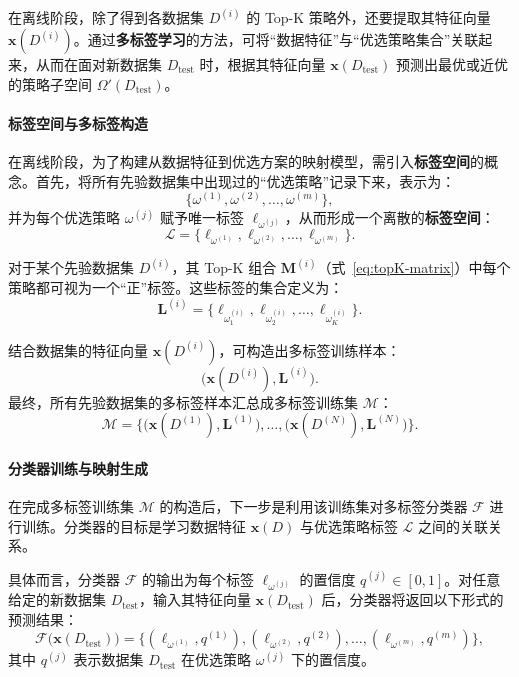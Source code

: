 \documentclass[10pt]{article} %
\numberwithin{equation}{section}
\begin{document}
在离线阶段，除了得到各数据集 $D^{(i)}$ 的 Top-K 策略外，还要提取其特征向量 $\mathbf{x}(D^{(i)})$。通过\textbf{多标签学习}的方法，可将“数据特征”与“优选策略集合”关联起来，从而在面对新数据集 $D_{\text{test}}$ 时，根据其特征向量 $\mathbf{x}(D_{\text{test}})$ 预测出最优或近优的策略子空间 $\Omega'(D_{\text{test}})$。

\paragraph{标签空间与多标签构造}  
在离线阶段，为了构建从数据特征到优选方案的映射模型，需引入\textbf{标签空间}的概念。首先，将所有先验数据集中出现过的“优选策略”记录下来，表示为：
\[
\{\omega^{(1)}, \omega^{(2)}, \ldots, \omega^{(m)}\},
\]
并为每个优选策略 $\omega^{(j)}$ 赋予唯一标签 $\ell_{\omega^{(j)}}$，从而形成一个离散的\textbf{标签空间}：
\begin{equation}\label{eq:label-space}
\mathcal{L}
= \{\ell_{\omega^{(1)}}, \ell_{\omega^{(2)}}, \ldots, \ell_{\omega^{(m)}}\}.
\end{equation}

对于某个先验数据集 $D^{(i)}$，其 Top-K 组合 $\mathbf{M}^{(i)}$（式~\eqref{eq:topK-matrix}）中每个策略都可视为一个“正”标签。这些标签的集合定义为：
\begin{equation}\label{eq:label-space-for-D}
\mathbf{L}^{(i)}
= \{\ell_{\omega_1^{(i)}}, \ell_{\omega_2^{(i)}}, \ldots, \ell_{\omega_K^{(i)}}\}.
\end{equation}

结合数据集的特征向量 $\mathbf{x}(D^{(i)})$，可构造出多标签训练样本：
\[
\bigl(\mathbf{x}(D^{(i)}), \mathbf{L}^{(i)}\bigr).
\]
最终，所有先验数据集的多标签样本汇总成多标签训练集 $\mathcal{M}$：
\begin{equation}\label{eq:training-set}
\mathcal{M}
= \bigl\{\bigl(\mathbf{x}(D^{(1)}), \mathbf{L}^{(1)}\bigr), \ldots, \bigl(\mathbf{x}(D^{(N)}), \mathbf{L}^{(N)}\bigr)\bigr\}.
\end{equation}

\paragraph{分类器训练与映射生成}  
在完成多标签训练集 $\mathcal{M}$ 的构造后，下一步是利用该训练集对多标签分类器 $\mathcal{F}$ 进行训练。分类器的目标是学习数据特征 $\mathbf{x}(D)$ 与优选策略标签 $\mathcal{L}$ 之间的关联关系。

具体而言，分类器 $\mathcal{F}$ 的输出为每个标签 $\ell_{\omega^{(j)}}$ 的置信度 $q^{(j)} \in [0,1]$。对任意给定的新数据集 $D_{\text{test}}$，输入其特征向量 $\mathbf{x}(D_{\text{test}})$ 后，分类器将返回以下形式的预测结果：
\begin{equation}\label{eq:classifier}
\mathcal{F}\bigl(\mathbf{x}(D_{\text{test}})\bigr)
= \bigl\{(\ell_{\omega^{(1)}}, q^{(1)}), (\ell_{\omega^{(2)}}, q^{(2)}), \ldots, (\ell_{\omega^{(m)}}, q^{(m)})\bigr\},
\end{equation}
其中 $q^{(j)}$ 表示数据集 $D_{\text{test}}$ 在优选策略 $\omega^{(j)}$ 下的置信度。
\end{document}

